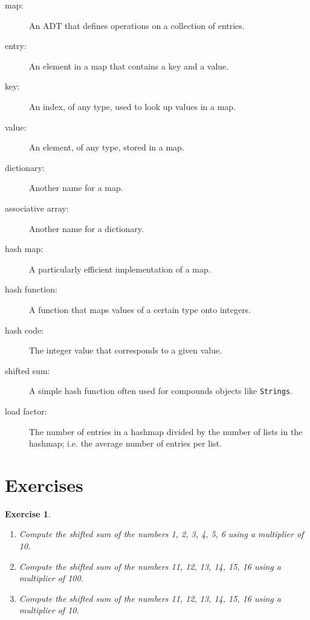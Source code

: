 \documentclass[12pt]{book}
\theoremstyle{exercise}
\newtheorem{exercise}{Exercise}[chapter]
\begin{document}
\begin{description}

\item[map:] An ADT that defines operations on a collection of
entries.

\item[entry:] An element in a map that contains a key and a value.

\item[key:] An index, of any type, used to look up values in a map.

\item[value:] An element, of any type, stored in a map.

\item[dictionary:] Another name for a map.

\item[associative array:] Another name for a dictionary.

\item[hash map:] A particularly efficient implementation of a map.

\item[hash function:] A function that maps values of a certain type
onto integers.

\item[hash code:] The integer value that corresponds to a given value.

\item[shifted sum:] A simple hash function often used for compounds
objects like {\tt Strings}.

\item[load factor:] The number of entries in a hashmap divided
by the number of lists in the hashmap; i.e. the average number
of entries per list.


\end{description}

\section{Exercises}

\begin{exercise}
\begin{enumerate}
\item Compute the shifted sum of the numbers 1, 2, 3, 4, 5, 6 using
a multiplier of 10.

\item Compute the shifted sum of the numbers 11, 12, 13, 14, 15, 16 using
a multiplier of 100.

\item Compute the shifted sum of the numbers 11, 12, 13, 14, 15, 16 using
a multiplier of 10.
\end{enumerate}
\end{exercise}
\end{document}
